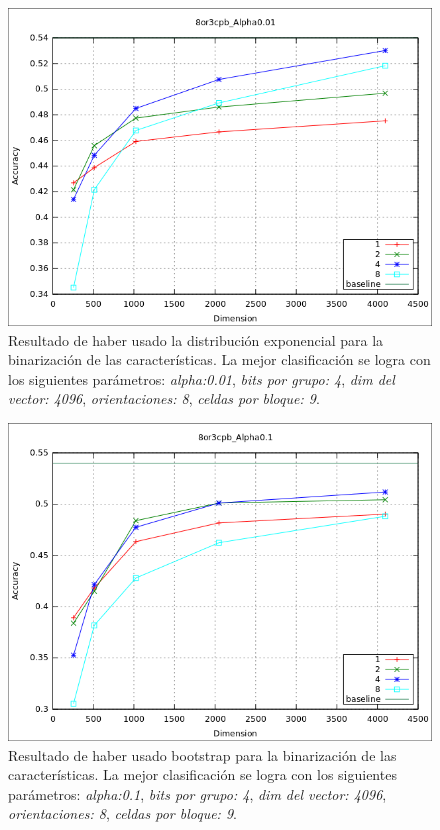 			\begin{figure}[htbp]
				\centering
				\includegraphics[scale=0.6]{img/resultados/reales/expon_8or3cpb_Alpha0,01.png}
				\caption[Reales con umbral exponencial]{Resultado de haber usado la distribución exponencial para la binarización de las características. La mejor clasificación se logra con los siguientes parámetros: \textit{alpha:0.01}, \textit{bits por grupo: 4}, \textit{dim del vector: 4096}, \textit{orientaciones: 8}, \textit{celdas por bloque: 9}.}
				\label{fig: Reales-expon-8or9cpbAlph0.01}
			\end{figure}
			
			\begin{figure}[htbp]
				\centering
				\includegraphics[scale=0.6]{img/resultados/reales/bootstrap_8or3cpb_Alpha0,1.png}
				\caption[Reales con umbral boostrap]{Resultado de haber usado bootstrap para la binarización de las características. La mejor clasificación se logra con los siguientes parámetros: \textit{alpha:0.1}, \textit{bits por grupo: 4}, \textit{dim del vector: 4096}, \textit{orientaciones: 8}, \textit{celdas por bloque: 9}.}
				\label{fig: Reales-bootstrap-8or9cpbAlph0.1}
			\end{figure}
			
